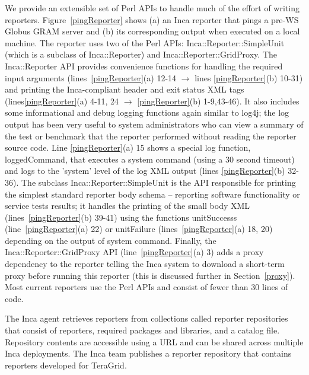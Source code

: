 \documentclass[times,10pt,twocolumn]{article}
\begin{document}
We provide an extensible set of Perl APIs to handle much of the effort of
writing reporters.  Figure~\ref{pingReporter} shows (a) an Inca reporter that
pings a pre-WS Globus GRAM server and (b) its corresponding output when
executed on a local machine.  The reporter uses two of the Perl APIs:
Inca::Reporter::SimpleUnit (which is a subclass of Inca::Reporter) and
Inca::Reporter::GridProxy.  The Inca::Reporter API provides convenience
functions for handling the required input arguments
(lines~\ref{pingReporter}(a) 12-14 $\rightarrow$ lines \ref{pingReporter}(b)
10-31) and printing the Inca-compliant header and exit status XML tags
(lines\ref{pingReporter}(a) 4-11, 24 $\rightarrow$ \ref{pingReporter}(b)
1-9,43-46).  It also includes some informational and debug logging functions
again similar to log4j; the log output has been very useful to system
administrators who can view a summary of the test or benchmark that the
reporter performed without reading the reporter source code.  Line
\ref{pingReporter}(a) 15 shows a special log function, loggedCommand, that
executes a system command (using a 30 second timeout) and logs to the 'system'
level of the log XML output (lines \ref{pingReporter}(b) 32-36).  The subclass
Inca::Reporter::SimpleUnit is the API responsible for printing the simplest
standard reporter body schema -- reporting software functionality or service
tests results; it handles the printing of the small body XML
(lines~\ref{pingReporter}(b) 39-41) using the functions unitSuccesss
(line~\ref{pingReporter}(a) 22) or unitFailure (lines~\ref{pingReporter}(a)
18, 20) depending on the output of system command.  Finally, the
Inca::Reporter::GridProxy API (line~\ref{pingReporter}(a) 3) adds a proxy
dependency to the reporter telling the Inca system to download a
short-term proxy before running this reporter (this is discussed further in
Section~\ref{proxy}).  Most current reporters use the Perl APIs and consist of
fewer than 30 lines of code.


The Inca agent retrieves reporters from collections called reporter
repositories that consist of reporters, required packages and libraries,
and a catalog file. Repository contents are accessible using a URL and can
be shared across multiple Inca deployments. The Inca team publishes a
reporter repository that contains reporters developed for TeraGrid.  

\end{document}
